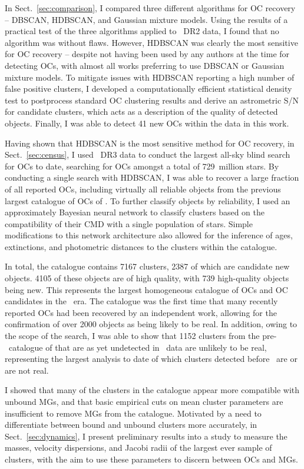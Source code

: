 In Sect.~\ref{sec:comparison}, I compared three different algorithms for OC recovery -- DBSCAN, HDBSCAN, and Gaussian mixture models. Using the results of a practical test of the three algorithms applied to \gaia\ DR2 data, I found that no algorithm was without flaws. However, HDBSCAN was clearly the most sensitive for OC recovery -- despite not having been used by any authors at the time for detecting OCs, with almost all works preferring to use DBSCAN or Gaussian mixture models. To mitigate issues with HDBSCAN reporting a high number of false positive clusters, I developed a computationally efficient statistical density test to postprocess standard OC clustering results and derive an astrometric S/N for candidate clusters, which acts as a description of the quality of detected objects. Finally, I was able to detect 41 new OCs within the data in this work. 

Having shown that HDBSCAN is the most sensitive method for OC recovery, in Sect.~\ref{sec:census}, I used \gaia\ DR3 data to conduct the largest all-sky blind search for OCs to date, searching for OCs amongst a total of 729~million stars. By conducting a single search with HDBSCAN, I was able to recover a large fraction of all reported OCs, including virtually all reliable objects from the previous largest catalogue of OCs of \cite{cantat-gaudin_clusters_2020}. To further classify objects by reliability, I used an approximately Bayesian neural network to classify clusters based on the compatibility of their CMD with a single population of stars. Simple modifications to this network architecture also allowed for the inference of ages, extinctions, and photometric distances to the clusters within the catalogue.

In total, the catalogue contains 7167 clusters, 2387 of which are candidate new objects. 4105 of these objects are of high quality, with 739 high-quality objects being new. This represents the largest homogeneous catalogue of OCs and OC candidates in the \gaia\ era. The catalogue was the first time that many recently reported OCs had been recovered by an independent work, allowing for the confirmation of over 2000 objects as being likely to be real. In addition, owing to the scope of the search, I was able to show that 1152 clusters from the pre-\gaia\ catalogue of \cite{kharchenko_global_2013} that are as yet undetected in \gaia\ data are unlikely to be real, representing the largest analysis to date of which clusters detected before \gaia\ are or are not real.

I showed that many of the clusters in the catalogue appear more compatible with unbound MGs, and that basic empirical cuts on mean cluster parameters are insufficient to remove MGs from the catalogue. Motivated by a need to differentiate between bound and unbound clusters more accurately, in Sect.~\ref{sec:dynamics}, I present preliminary results into a study to measure the masses, velocity dispersions, and Jacobi radii of the largest ever sample of clusters, with the aim to use these parameters to discern between OCs and MGs.

